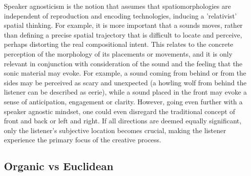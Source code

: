 \documentclass{article}
\begin{document}
Speaker agnosticism is the notion that assumes that spatiomorphologies\cite{Smalley1997} are independent of reproduction and encoding technologies, inducing a 'relativist' spatial thinking\cite{Harrison2010}. For example, it is more important that a sounds moves, rather than defining a precise spatial trajectory that is difficult to locate and perceive, perhaps distorting the real compositional intent. This relates to the concrete perception of the morphology of its placements or movements, and it is only relevant in conjunction with consideration of the sound and the feeling that the sonic material may evoke. For example, a sound coming from behind or from the sides may be perceived as scary and unexpected (a howling wolf from behind the listener can be described as eerie), while a sound placed in the front may evoke a sense of anticipation, engagement or clarity. However, going even further with a speaker agnostic mindset, one could even disregard the traditional concept of front and back or left and right. If all directions are deemed equally significant, only the listener's subjective location becomes crucial, making the listener experience the primary focus of the creative process.  %

        \subsection{Organic vs Euclidean}
	\label{sec:organic }
\end{document}
